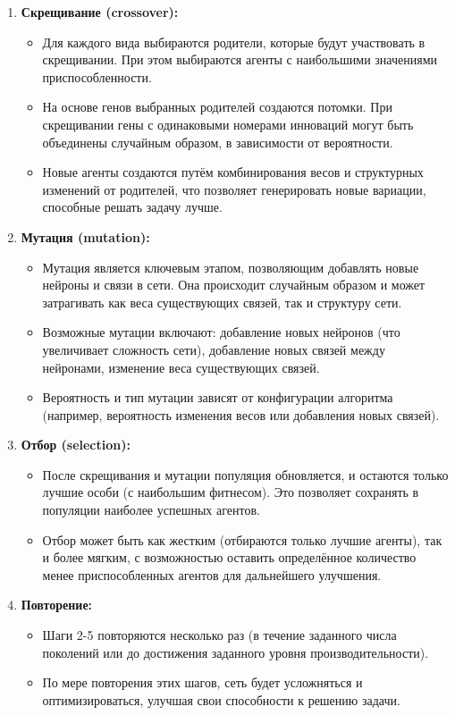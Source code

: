 \documentclass[a4paper,12pt]{article}
\begin{document}
\begin{enumerate}
    \item \textbf{Скрещивание (crossover):}
    \begin{itemize}
        \item Для каждого вида выбираются родители, которые будут участвовать в скрещивании. При этом выбираются агенты с наибольшими значениями приспособленности.
        \item На основе генов выбранных родителей создаются потомки. При скрещивании гены с одинаковыми номерами инноваций могут быть объединены случайным образом, в зависимости от вероятности.
        \item Новые агенты создаются путём комбинирования весов и структурных изменений от родителей, что позволяет генерировать новые вариации, способные решать задачу лучше.
    \end{itemize}

    \item \textbf{Мутация (mutation):}
    \begin{itemize}
        \item Мутация является ключевым этапом, позволяющим добавлять новые нейроны и связи в сети. Она происходит случайным образом и может затрагивать как веса существующих связей, так и структуру сети.
        \item Возможные мутации включают: добавление новых нейронов (что увеличивает сложность сети), добавление новых связей между нейронами, изменение веса существующих связей.
        \item Вероятность и тип мутации зависят от конфигурации алгоритма (например, вероятность изменения весов или добавления новых связей).
    \end{itemize}

    \item \textbf{Отбор (selection):}
    \begin{itemize}
        \item После скрещивания и мутации популяция обновляется, и остаются только лучшие особи (с наибольшим фитнесом). Это позволяет сохранять в популяции наиболее успешных агентов.
        \item Отбор может быть как жестким (отбираются только лучшие агенты), так и более мягким, с возможностью оставить определённое количество менее приспособленных агентов для дальнейшего улучшения.
    \end{itemize}

    \item \textbf{Повторение:}
    \begin{itemize}
        \item Шаги 2-5 повторяются несколько раз (в течение заданного числа поколений или до достижения заданного уровня производительности).
        \item По мере повторения этих шагов, сеть будет усложняться и оптимизироваться, улучшая свои способности к решению задачи.
    \end{itemize}


\end{enumerate}
\end{document}
